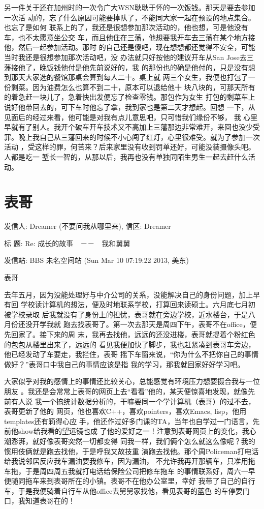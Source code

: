 \documentclass[12pt]{book}
\begin{document}
另一件关于还在加州时的一次令广大WSN耿耿于怀的一次饭钱。那天是要去参加一次活
动的，忘了什么原因可能要掉队了，不能同大家一起在预设的地点集合。也忘了是如何
联系上的了，我还是很想参加那次活动的，他也想，可是他没有车，也不太愿意坐公交
车，而且他住在三藩，他想要我开车去三藩在某个地方接他，然后一起参加活动。那时
的自己还是傻吧，现在想想都还觉得不安全，可能当时我还是很想参加那次活动吧，没
办法就只好按他的建议开车从San Jose去三藩接他了，晚饭钱他付是他先前说好的，我
的那份也的确是他付的，只是没有想到那天大家选的餐馆那桌会算到每人二十。桌上就
两三个女生，我便也打包了一份剩菜。因为油费怎么也算不到二十，原本可以退给他十
块八块的，可那天所有的着急赶一块儿了，急着快出发便忘了检查零钱。那包作为女生
打包的剩菜车上说好他带回去的，可下车时他忘了拿，我到家也是第二天才想起。回想
一下，从见面后的经过来看，他可能是对我有点儿意思吧，只可惜我们缘份不够， 我
心里早就有了别人。我开个破车开车技术又不高加上三藩那边非常难开，来回也没少受
罪。晚上我自己从三藩回来的时候不小心闯了红灯，心里很难受。就为了参加一次活动
，受这样的罪，何苦来？后来家里没有收到罚单还好，可能没装摄像头吧。人都是吃一
堑长一智的，从那以后，我再也没有单独同陌生男生一起去赶什么活动。
\section{表哥}
\label{sec-12-5}
发信人: Dreamer (不要问我从哪里来), 信区: Dreamer

标  题: Re: 成长的故事　－－　我和舅舅

发信站: BBS 未名空间站 (Sun Mar 10 07:19:22 2013, 美东)

表哥

去年五月，因为没能处理好与中介公司的关系，没能解决自己的身份问题，加上早有回
学校读计算机的想法，便及时地联系学校，打算回来读硕士。六月底七月初被学校录取
后我就没有了身份上的担忧，表哥就在旁边学校，近水楼台，于是八月份还没开学我就
跑去找表哥了。第一次去那天是周四下午，表哥不在office，便先回家了。接下来的周
末，我再去找他，远远的还没进楼，表哥就提着个粉红色的包包从楼里出来了，远远的
看见我便加快了脚步，我也赶紧凑到表哥车旁边，他已经发动了车要走，我拦住，表哥
摇下车窗来说，“你为什么不把你自己的事情做好？”表哥口中我自己的事情应该是指
我的学习，那我就回家好好学习吧。

大家似乎对我的感情上的事情还比较关心，总能感觉有环境压力想要摄合我与一位朋友
。我还是会常常上表哥的网页上去“看看”他的，某天便惊喜地发现，就像先前有人说
我一个搞统计数据分析的，干嘛要同一个学计算机（表哥）的过不去，表哥更新了他的
网页，他也喜欢C++，喜欢pointers，喜欢Emacs, lisp，他用templates还有筣得心应
手，他还作过好多门课的TA，当年也自学过一门语言，先前他show给我看的望远镜也成
了他的爱好之一！注意到表哥网页上的变化，我心潮澎湃，就好像表哥突然一切都变得
同我一样，我们俩个怎么就这么像呢？我的惯用伎俩就是跑去找他，于是呼我又故技重
演跑去找他。那个周Policeman打电话给我说邻居反应我车漏油要我修车，因为漏油，
不允许我再开那辆车，只准用拖车拖，于是周四周五我就打电话给保险公司把修车拖车
的事情联系好，周六一早便随同拖车来到表哥所在的小镇。表哥不在他办公室里，幸好
我带了自己的自行车，于是我便骑着自行车从他office去舅舅家找他，看见表哥的蓝色
的车停要门口，我知道表哥在的！
\end{document}
